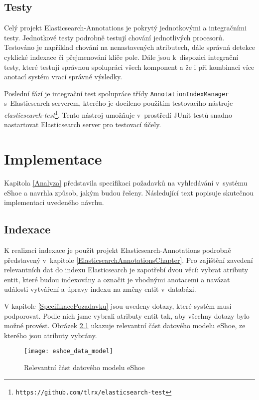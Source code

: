 \documentclass[11pt,oneside]{fithesis2}
\begin{document}
\section{Testy}
Celý projekt Elasticsearch-Annotations je pokrytý jednotkovými a integračními testy. Jednotkové testy podrobně testují chování jednotlivých procesorů. Testováno je například chování na nenastavených atributech, dále správná detekce cyklické indexace či přejmenování klíče pole. Dále jsou k~dispozici integrační testy, které testují správnou spolupráci všech komponent a že i při kombinaci více anotací systém vrací správné výsledky. 

Poslední fází je integrační test spolupráce třídy \texttt{AnnotationIndexManager} s~Elasticsearch serverem, kterého je docíleno použitím testovacího nástroje \emph{elasticsearch-test}\footnote{\texttt{https://github.com/tlrx/elasticsearch-test}}. Tento nástroj umožňuje v~prostředí JUnit testů snadno nastartovat Elasticsearch server pro testovací účely.

\chapter{Implementace}
Kapitola \ref{Analyza} představila specifikaci požadavků na vyhledávání v~systému eShoe a navrhla způsob, jakým budou řešeny. Následující text popisuje skutečnou implementaci uvedeného návrhu.

\section{Indexace}
\label{ImplementaceIndexace}
K realizaci indexace je použit projekt Elasticsearch-Annotations podrobně představený v~kapitole \ref{ElasticsearchAnnotationsChapter}. Pro zajištění zavedení relevantních dat do indexu Elasticsearch je zapotřebí dvou věcí: vybrat atributy entit, které budou indexovány a označit je vhodnými anotacemi a navázat události vytváření a úpravy indexu na změny entit v~databázi.

V kapitole \ref{SpecifikacePozadavku} jsou uvedeny dotazy, které systém musí podporovat. Podle nich jsme vybrali atributy entit tak, aby všechny dotazy bylo možné provést. Obrázek \ref{DatovyModelEshoe} ukazuje relevantní část datového modelu eShoe, ze kterého jsou atributy vybrány.

\begin{figure}[htb]
	\begin{center}
		\texttt{[image: eshoe\_data\_model]}
	\end{center}
	\caption{Relevantní část datového modelu eShoe}	
	\label{DatovyModelEshoe}
\end{figure}
\end{document}
